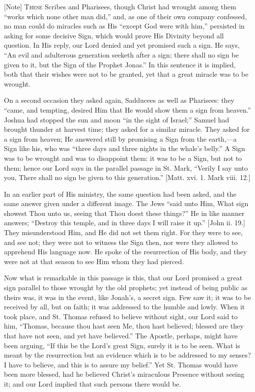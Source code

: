 [Note] T\textsc{hese} Scribes and Pharisees,
though Christ had wrought among them ``works which none other man
did,'' and, as one of their own company confessed, no man could do
miracles such as His ``except God were with him,'' persisted in
asking for some decisive Sign, which would prove His Divinity beyond all
question. In His reply, our Lord denied and yet promised such a sign. He
says, ``An evil and adulterous generation seeketh after a sign;
there shall no sign be given to it, but the Sign of the Prophet
Jonas.'' In this sentence it is implied, both that their wishes were
not to be granted, yet that a great miracle was to be wrought.

On a second occasion they asked again, Sadducees as well as
Pharisees: they ``came, and tempting, desired Him that He would show
them a sign from heaven.'' Joshua had stopped the sun and moon
``in the sight of Israel;'' Samuel had brought thunder at
harvest time; they asked for a similar miracle. They asked for a sign
from heaven; He answered still by promising a Sign from the earth,—a
Sign like his, who was ``three days and three nights in the whale's
belly.'' A Sign was to be wrought and was to disappoint them: it was
to be a Sign, but not to them; hence our Lord says in the parallel
passage in St. Mark, ``Verily I say unto you, There shall no sign be
given to this generation.'' [Matt. xvi. 1. Mark viii. 12.]

In an earlier part of His ministry, the same question had been asked,
and the same answer given under a different image. The Jews ``said
unto Him, What sign showest Thou unto us, seeing that Thou doest these
things?'' He in like manner answers; ``Destroy this temple, and
in three days I will raise it up.'' [John ii. 19.] They
misunderstood Him, and He did not set them right. For they were to see,
and see not; they were not to witness the Sign then, nor were they
allowed to apprehend His language now. He spoke of the resurrection of
His body, and they were not at that season to see Him whom they had
pierced.

Now what is remarkable in this passage is this, that our Lord
promised a great sign parallel to those wrought by the old prophets; yet
instead of being public as theirs was, it was in the event, like
Jonah's, a secret sign. Few saw it; it was to be received by all, but on
faith; it was addressed to the humble and lowly. When it took place, and
St. Thomas refused to believe without sight, our Lord said to him,
``Thomas, because thou hast seen Me, thou hast believed; blessed are
they that have not seen, and yet have believed.'' The Apostle,
perhaps, might have been arguing, ``If this be the Lord's great
Sign, surely it is to be seen. What is meant by the resurrection but an
evidence which is to be addressed to my senses? I have to believe, and
this is to assure my belief.'' Yet St. Thomas would have been more
blessed, had he believed Christ's miraculous Presence without seeing it;
and our Lord implied that such persons there would be.


